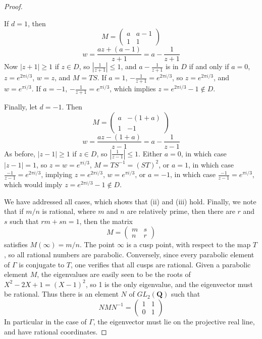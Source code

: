 \begin{proof}
\begin{itemize}
        If $d = 1$, then
        \[ M = \begin{pmatrix} a & a-1 \\ 1 & 1 \end{pmatrix} \]
        \[ w = \frac{az + (a-1)}{z + 1} = a - \frac{1}{z+1} \]
        Now $|z+1| \geq 1$ if $z \in D$, so $|\frac{1}{z+1}| \leq 1$, and $a - \frac{1}{z+1}$ is in $D$ if and only if $a = 0$, $z = e^{2\pi i/3}$, $w = z$, and $M = TS$. If $a = 1$, $- \frac{1}{z+1} = e^{2\pi i/3}$, so $z = e^{2 \pi i/3}$, and $w = e^{\pi i/3}$. If $a = -1$, $- \frac{1}{z+1} = e^{\pi i/3}$, which implies $z = e^{2 \pi i/3} - 1 \not \in D$.

        Finally, let $d = -1$. Then
        \[ M = \begin{pmatrix} a & -(1 + a) \\ 1 & -1 \end{pmatrix} \]
        \[ w = \frac{az - (1+a)}{z-1} = a - \frac{1}{z-1} \]
        As before, $|z-1| \geq 1$ if $z \in D$, so $|\frac{1}{z-1}| \leq 1$. Either $a = 0$, in which case $|z-1| = 1$, so $z = w = e^{\pi i/3}$, $M = TS^{-1} = (ST)^2$, or $a = 1$, in which case $\frac{-1}{z-1} = e^{2\pi i/3}$, implying $z = e^{2\pi i/3}$, $w = e^{\pi i/3}$, or $a = -1$, in which case $\frac{-1}{z-1} = e^{\pi i/3}$, which would imply $z = e^{2\pi i/3} - 1 \not \in D$.
    \end{itemize}
    We have addressed all cases, which shows that (ii) and (iii) hold. Finally, we note that if $m/n$ is rational, where $m$ and $n$ are relatively prime, then there are $r$ and $s$ such that $rm + sn = 1$, then the matrix
    \[ M = \begin{pmatrix} m & s \\ n & r \end{pmatrix} \]
    satisfies $M(\infty) = m/n$. The point $\infty$ is a cusp point, with respect to the map $T$, so all rational numbers are parabolic. Conversely, since every parabolic element of $\Gamma$ is conjugate to $T$, one verifies that all cusps are rational. Given a parabolic element $M$, the eigenvalues are easily seen to be the roots of $X^2 -2X + 1 = (X - 1)^2$, so 1 is the only eigenvalue, and the eigenvector must be rational. Thus there is an element $N$ of $GL_2(\mathbf{Q})$ such that
    \[ NMN^{-1} = \begin{pmatrix} 1 & 1 \\ 0 & 1 \end{pmatrix} \]
    In particular in the case of $\Gamma$, the eigenvector must lie on the projective real line, and have rational coordinates.
\end{proof}

